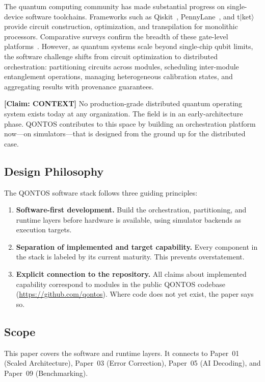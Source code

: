 \documentclass[conference]{IEEEtran}
\begin{document}
The quantum computing community has made substantial progress on single-device software toolchains. Frameworks such as Qiskit~\cite{Qiskit2023}, PennyLane~\cite{Bergholm2022}, and t$|$ket$\rangle$~\cite{Sivarajah2020} provide circuit construction, optimization, and transpilation for monolithic processors. Comparative surveys confirm the breadth of these gate-level platforms~\cite{LaRose2019}. However, as quantum systems scale beyond single-chip qubit limits, the software challenge shifts from circuit optimization to distributed orchestration: partitioning circuits across modules, scheduling inter-module entanglement operations, managing heterogeneous calibration states, and aggregating results with provenance guarantees.

\textbf{[Claim: CONTEXT]} No production-grade distributed quantum operating system exists today at any organization. The field is in an early-architecture phase. QONTOS contributes to this space by building an orchestration platform now---on simulators---that is designed from the ground up for the distributed case.

\subsection{Design Philosophy}

The QONTOS software stack follows three guiding principles:

\begin{enumerate}
\item \textbf{Software-first development.} Build the orchestration, partitioning, and runtime layers before hardware is available, using simulator backends as execution targets.
\item \textbf{Separation of implemented and target capability.} Every component in the stack is labeled by its current maturity. This prevents overstatement.
\item \textbf{Explicit connection to the repository.} All claims about implemented capability correspond to modules in the public QONTOS codebase (\url{https://github.com/qontos}). Where code does not yet exist, the paper says so.
\end{enumerate}

\subsection{Scope}

This paper covers the software and runtime layers. It connects to Paper~01 (Scaled Architecture), Paper~03 (Error Correction), Paper~05 (AI Decoding), and Paper~09 (Benchmarking).
\end{document}
